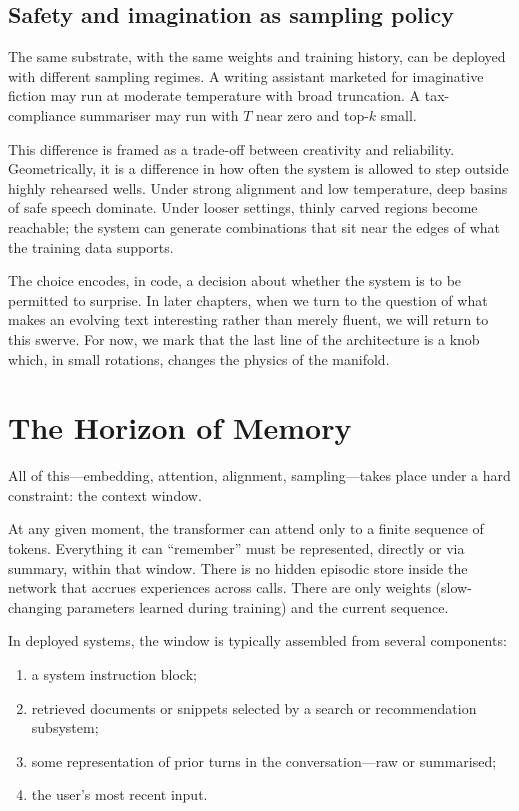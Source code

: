 \documentclass[12pt,a4paper]{article}
\begin{document}
\subsection*{Safety and imagination as sampling policy}

The same substrate, with the same weights and training history, can be deployed with different sampling regimes. A writing assistant marketed for imaginative fiction may run at moderate temperature with broad truncation. A tax-compliance summariser may run with $T$ near zero and top-$k$ small.

This difference is framed as a trade-off between creativity and reliability. Geometrically, it is a difference in how often the system is allowed to step outside highly rehearsed wells. Under strong alignment and low temperature, deep basins of safe speech dominate. Under looser settings, thinly carved regions become reachable; the system can generate combinations that sit near the edges of what the training data supports.

The choice encodes, in code, a decision about whether the system is to be permitted to surprise. In later chapters, when we turn to the question of what makes an evolving text interesting rather than merely fluent, we will return to this swerve. For now, we mark that the last line of the architecture is a knob which, in small rotations, changes the physics of the manifold.

\section{The Horizon of Memory}

All of this---embedding, attention, alignment, sampling---takes place under a hard constraint: the context window.

At any given moment, the transformer can attend only to a finite sequence of tokens. Everything it can ``remember'' must be represented, directly or via summary, within that window. There is no hidden episodic store inside the network that accrues experiences across calls. There are only weights (slow-changing parameters learned during training) and the current sequence.

In deployed systems, the window is typically assembled from several components:

\begin{enumerate}
  \item a system instruction block;
  \item retrieved documents or snippets selected by a search or recommendation subsystem;
  \item some representation of prior turns in the conversation---raw or summarised;
  \item the user's most recent input.
\end{enumerate}
\end{document}
